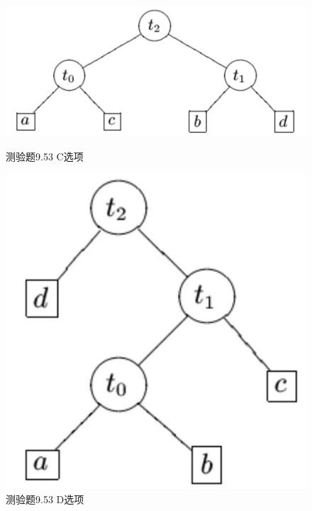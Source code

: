 \documentclass[UTF8, heading=true]{ctexart}
\begin{document}
\begin{figure}[H]
  \centering
  \begin{minipage}[t]{0.35\textwidth}
      \centering
      \includegraphics[width=1\textwidth]{9.53_3.jpg} %
      \vspace{-0.3cm}
      \caption{测验题9.53 C选项}
  \end{minipage}
  \hspace{0.1\textwidth} %
  \begin{minipage}[t]{0.23\textwidth}
      \centering
      \includegraphics[width=1\textwidth]{9.53_4.jpg} %
      \vspace{-0.3cm}
      \caption{测验题9.53 D选项}
\end{minipage}
\end{figure}
\end{document}
